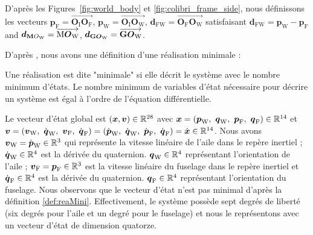 D'après les Figures~\ref{fig:world_body} et \ref{fig:colibri_frame_side}, nous définissons les vecteurs $\boldsymbol{p}_{\text{F}} = \overrightarrow{\boldsymbol{O}_{\text{I}} \boldsymbol{O}_{\text{F}}} $, $\boldsymbol{p}_{\text{W}} = \overrightarrow{\boldsymbol{O}_{\text{I}} \boldsymbol{O}_{\text{W}}} $, $\boldsymbol{d}_{\text{FW}} = \overrightarrow{\boldsymbol{O}_{\text{F}} \boldsymbol{O}_{\text{W}}} $ satisfaisant $\boldsymbol{d}_{\text{FW}} = \boldsymbol{p}_{\text{W}} - \boldsymbol{p}_{\text{F}}$ and $\boldsymbol{d}_{\text{\textbf{M}}O_{\text{W}}} = \overrightarrow{\text{M} \boldsymbol{O}_{\text{W}} }$, $\boldsymbol{d}_{\text{\textbf{G}}\boldsymbol{O}_{\text{W}}} = \overrightarrow{\text{\textbf{G}} \boldsymbol{O}_{\text{W}} }$.

D'après \cite{Tangirala2015}, nous avons une définition d'une réalisation minimale : 
\begin{definition}
    \label{def:reaMini}
    Une réalisation est dite "minimale" si elle décrit le système avec le nombre minimum d'états. Le nombre minimum de variables d'état nécessaire pour décrire un système est égal à l'ordre de l'équation différentielle.
\end{definition}


Le vecteur d'état global est $(\boldsymbol{x},\boldsymbol{v}) \in {\mathbb R}^{28}$ avec $\boldsymbol{x}=(\boldsymbol{p}_{\text{W}},~\boldsymbol{q}_{\text{W}},~\boldsymbol{p}_{\text{F}},~\boldsymbol{q}_{\text{F}}) \in {\mathbb R}^{14}$ et $\boldsymbol{v}=(\boldsymbol{v}_{\text{W}},~\dot{\boldsymbol{q}}_{\text{W}},~\boldsymbol{v}_{\text{F}},~\dot{\boldsymbol{q}}_{\text{F}}) = (\dot{\boldsymbol{p}}_{\text{W}},~\dot{\boldsymbol{q}}_{\text{W}},~\dot{\boldsymbol{p}}_{\text{F}},~\dot{\boldsymbol{q}}_{\text{F}})=\dot{\boldsymbol{x}} \in {\mathbb R}^{14}$. Nous avons $\boldsymbol{v}_{\text{W}} = \dot{\boldsymbol{p}}_{\text{W}} \in {\mathbb R}^{3}$ qui représente la vitesse linéaire de l'aile dans le repère inertiel ; $\dot{\boldsymbol{q}}_{\text{W}} \in {\mathbb R}^{4}$  est la dérivée du quaternion. $\boldsymbol{q}_{\text{W}} \in {\mathbb R}^{4}$ représentant l'orientation de l'aile ; $\boldsymbol{v}_{\text{F}} =\boldsymbol{p}_{\text{F}} \in {\mathbb R}^{3}$  est la vitesse linéaire du fuselage dans le repère inertiel et $\dot{\boldsymbol{q}}_{\text{F}} \in {\mathbb R}^{4}$  est la dérivée du quaternion. $\boldsymbol{q}_{\text{F}} \in {\mathbb R}^{4}$ représentant l'orientation du fuselage. Nous observons que le vecteur d'état n'est pas minimal d'après la définition \ref{def:reaMini}. Effectivement, le système possède sept degrés de liberté (six degrés pour l'aile et un degré pour le fuselage) et nous le représentons avec un vecteur d'état de dimension quatorze.

